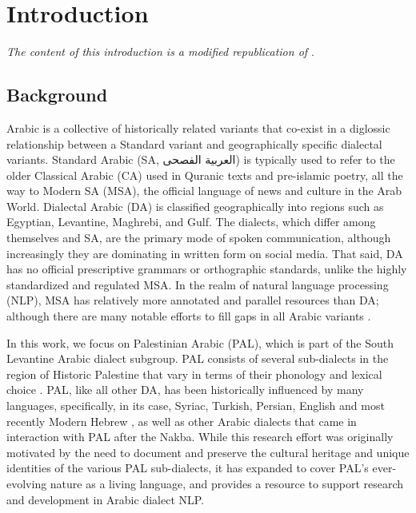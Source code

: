 \chapter{Introduction}

\textit{The content of this introduction is a modified republication of \citet{dibas2022maknuune}}.

\pagestyle{plain}

\section*{Background}
%
Arabic is a collective of historically related variants that co-exist in a diglossic \citep{Ferguson:1959:diglossia} relationship between a Standard variant and geographically specific dialectal variants. Standard Arabic (SA, \foreignlanguage{arabic}{العربية الفصحى})
is typically used to refer to the older Classical Arabic (CA) used in Quranic texts and pre-islamic poetry, all the way to Modern SA (MSA), the official language of news and culture in the Arab World.  Dialectal Arabic (DA) is classified geographically into regions such as Egyptian, Levantine, Maghrebi, and Gulf.
The dialects, which  differ among themselves and SA, are the primary mode of spoken communication, although increasingly they are dominating in written form on social media.  That said, DA has no official prescriptive grammars or orthographic standards, unlike the highly standardized and regulated MSA.  In the realm of natural language processing (NLP), MSA has relatively more annotated and parallel resources than DA; although there are many notable efforts to fill gaps in all Arabic variants \citep{alyafeai2022masader}.

In this work, we focus on Palestinian Arabic (PAL), which is part of the South Levantine Arabic dialect subgroup. PAL consists of several sub-dialects in the region of Historic Palestine that %
vary in terms of their phonology and lexical choice \citep{Jarrar:2016:curras}. 
PAL, like all other DA,  has been historically influenced by many languages, specifically, in its case, Syriac, Turkish, Persian, English and most recently Modern Hebrew \citep{moin2019etymological}, as well as other Arabic dialects that came in interaction with PAL after the Nakba. %
%
While this research effort was originally motivated by the need to document and preserve the cultural heritage and unique identities 
of the various PAL sub-dialects, it has expanded to cover PAL's ever-evolving nature as a living language, and provides a resource to support research and development in Arabic dialect NLP.

